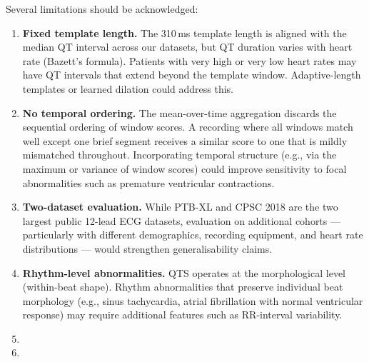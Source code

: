 \documentclass{iopjournal}
\begin{document}
Several limitations should be acknowledged:
\begin{enumerate}
\item \textbf{Fixed template length.} The 310\,ms template length is aligned with the median QT interval across our datasets, but QT duration varies with heart rate (Bazett's formula). Patients with very high or very low heart rates may have QT intervals that extend beyond the template window. Adaptive-length templates or learned dilation could address this.
\item \textbf{No temporal ordering.} The mean-over-time aggregation discards the sequential ordering of window scores. A recording where all windows match well except one brief segment receives a similar score to one that is mildly mismatched throughout. Incorporating temporal structure (e.g., via the maximum or variance of window scores) could improve sensitivity to focal abnormalities such as premature ventricular contractions.
\item \textbf{Two-dataset evaluation.} While PTB-XL and CPSC 2018 are the two largest public 12-lead ECG datasets, evaluation on additional cohorts --- particularly with different demographics, recording equipment, and heart rate distributions --- would strengthen generalisability claims. 
\item \textbf{Rhythm-level abnormalities.} QTS operates at the morphological level (within-beat shape). Rhythm abnormalities that preserve individual beat morphology (e.g., sinus tachycardia, atrial fibrillation with normal ventricular response) may require additional features such as RR-interval variability.
\item {}
\item {}
\end{enumerate}
\end{document}
